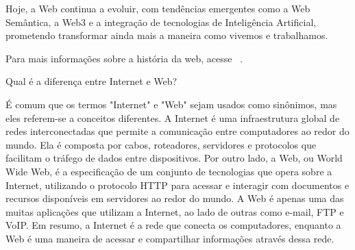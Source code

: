 Hoje, a Web continua a evoluir, com tendências emergentes como a Web Semântica, a Web3 e a integração de tecnologias de Inteligência Artificial, prometendo transformar ainda mais a maneira como vivemos e trabalhamos.

Para mais informações sobre a história da web, acesse ~\cite{cern_history_web}.



\begin{question}
    Qual é a diferença entre Internet e Web?
\end{question}

\begin{solution}
    É comum que os termos "Internet" e "Web" sejam usados como sinônimos, mas eles referem-se a conceitos diferentes. A Internet é uma infraestrutura global de redes interconectadas que permite a comunicação entre computadores ao redor do mundo. Ela é composta por cabos, roteadores, servidores e protocolos que facilitam o tráfego de dados entre dispositivos. Por outro lado, a Web, ou World Wide Web, é a especificação de um conjunto de tecnologias que opera sobre a Internet, utilizando o protocolo HTTP para acessar e interagir com documentos e recursos disponíveis em servidores ao redor do mundo. A Web é apenas uma das muitas aplicações que utilizam a Internet, ao lado de outras como e-mail, FTP e VoIP. Em resumo, a Internet é a rede que conecta os computadores, enquanto a Web é uma maneira de acessar e compartilhar informações através dessa rede.
\end{solution}




